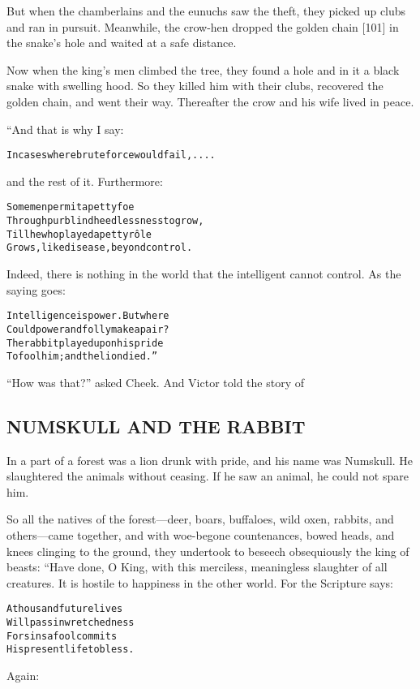 \documentclass{article}
\renewenvironment{verbatim}{\begin{alltt}\normalfont\begin{centering}}{\end{centering}\end{alltt}}
\begin{document}
But when the chamberlains and the eunuchs saw the theft, they
picked up clubs and ran in pursuit. Meanwhile, the crow-hen dropped
the golden chain [101] in the snake's hole and waited at a safe
distance.

Now when the king's men climbed the tree, they found a hole and in
it a black snake with swelling hood. So they killed him with their
clubs, recovered the golden chain, and went their way. Thereafter
the crow and his wife lived in peace.

“And that is why I say:

\begin{verbatim}
In cases where brute force would fail, ....
\end{verbatim}
and the rest of it. Furthermore:

\begin{verbatim}
Some men permit a petty foe
Through purblind heedlessness to grow,
Till he who played a petty rôle
Grows, like disease, beyond control.
\end{verbatim}
Indeed, there is nothing in the world that the intelligent cannot
control. As the saying goes:

\begin{verbatim}
Intelligence is power. But where
Could power and folly make a pair?
The rabbit played upon his pride
To fool him; and the lion died.”
\end{verbatim}
``How was that?'' asked Cheek. And Victor told the story of

\subsection{NUMSKULL AND THE RABBIT}

In a part of a forest was a lion drunk with pride, and his name was
Numskull. He slaughtered the animals without ceasing. If he saw an
animal, he could not spare him.

So all the natives of the forest---deer, boars, buffaloes, wild
oxen, rabbits, and others---came together, and with woe-begone
countenances, bowed heads, and knees clinging to the ground, they
undertook to beseech obsequiously the king of beasts: “Have done, O
King, with this merciless, meaningless slaughter of all creatures.
It is hostile to happiness in the other world. For the Scripture
says:

\begin{verbatim}
A thousand future lives
    Will pass in wretchedness
For sins a fool commits
    His present life to bless.
\end{verbatim}
Again:
\end{document}
